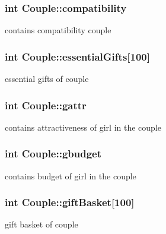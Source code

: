 \subsubsection[{\texorpdfstring{compatibility}{compatibility}}]{\setlength{\rightskip}{0pt plus 5cm}int Couple\+::compatibility}\hypertarget{classCouple_af47d6ced781259303e10836182abb8c1}{}\label{classCouple_af47d6ced781259303e10836182abb8c1}
contains compatibility couple 
\subsubsection[{\texorpdfstring{essential\+Gifts}{essentialGifts}}]{\setlength{\rightskip}{0pt plus 5cm}int Couple\+::essential\+Gifts\mbox{[}100\mbox{]}}\hypertarget{classCouple_a2d99d5e38764b95a798b7177d7d64d07}{}\label{classCouple_a2d99d5e38764b95a798b7177d7d64d07}
essential gifts of couple 
\subsubsection[{\texorpdfstring{gattr}{gattr}}]{\setlength{\rightskip}{0pt plus 5cm}int Couple\+::gattr}\hypertarget{classCouple_acba8117a9de951fd18038fa23d440e03}{}\label{classCouple_acba8117a9de951fd18038fa23d440e03}
contains attractiveness of girl in the couple 
\subsubsection[{\texorpdfstring{gbudget}{gbudget}}]{\setlength{\rightskip}{0pt plus 5cm}int Couple\+::gbudget}\hypertarget{classCouple_ad05788712d274549c30b564b4016c91d}{}\label{classCouple_ad05788712d274549c30b564b4016c91d}
contains budget of girl in the couple 
\subsubsection[{\texorpdfstring{gift\+Basket}{giftBasket}}]{\setlength{\rightskip}{0pt plus 5cm}int Couple\+::gift\+Basket\mbox{[}100\mbox{]}}\hypertarget{classCouple_a2080514dd79fa3bb90695fd295c02429}{}\label{classCouple_a2080514dd79fa3bb90695fd295c02429}
gift basket of couple 
